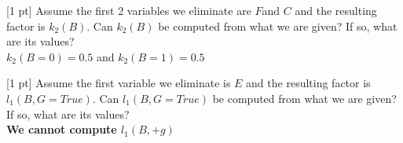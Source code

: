 \begin{question}{[1 pt]}
Assume the first 2 variables we eliminate are $F$and $C$ and the resulting factor is $k_2(B)$. Can $k_2(B)$ be computed from what we are given? If so, what are its values?\\
\vspace{1.4cm} $k_2(B=0)=0.5$ and $k_2(B=1)=0.5$
\end{question}

\begin{question}{[1 pt]}
Assume the first variable we eliminate is $E$ and the resulting factor is $l_1(B,G = True)$. Can $l_1(B, G = True)$ be computed from what we are given? If so, what are its values?\\
\textbf{We cannot compute $l_1(B,+g)$}
\end{question}

